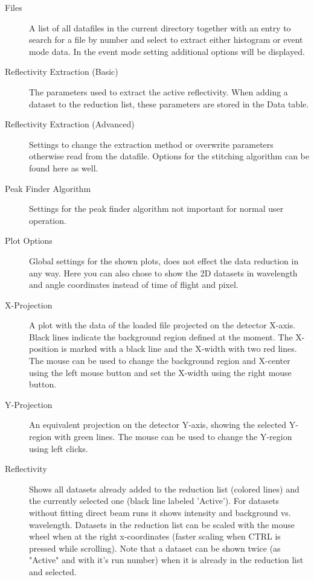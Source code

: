   \begin{description}
   \item[Files] A list of all datafiles in the current directory together with an entry to search for a file by number and select to extract either histogram or event mode data. In the event mode setting additional options will be displayed.

   \item[Reflectivity Extraction (Basic)] The parameters used to extract the active reflectivity. When adding a dataset to the reduction list, these parameters are stored in the Data table.
   \item[Reflectivity Extraction (Advanced)] Settings to change the extraction method or overwrite parameters otherwise read from the datafile. Options for the stitching algorithm can be found here as well.
   \item[Peak Finder Algorithm] Settings for the peak finder algorithm not important for normal user operation.
   \item[Plot Options] Global settings for the shown plots, does not effect the data reduction in any way. Here you can also chose to show the 2D datasets in wavelength and angle coordinates instead of time of flight and pixel.
   
   
   \item[X-Projection] A plot with the data of the loaded file projected on the detector X-axis. Black lines indicate the background region defined at the moment. The X-position is marked with a black line and the X-width with two red lines. The mouse can be used to change the background region and X-center using the left mouse button and set the X-width using the right mouse button.
   \item[Y-Projection] An equivalent projection on the detector Y-axis, showing the selected Y-region with green lines. The mouse can be used to change the Y-region using left clicks.
   
   \item[Reflectivity] Shows all datasets already added to the reduction list (colored lines) and the currently selected one (black line labeled 'Active'). For datasets without fitting direct beam runs it shows intensity and background vs. wavelength. 
   Datasets in the reduction list can be scaled with the mouse wheel when at the right x-coordinates (faster scaling when CTRL is pressed while scrolling).
   Note that a dataset can be shown twice (as "Active" and with it's run number) when it is already in the reduction list and selected.
\end{description}

